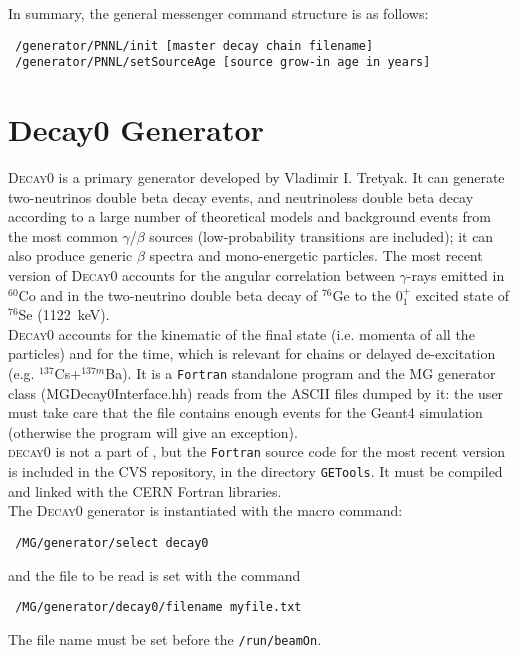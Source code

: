  In summary, the general messenger command structure is as follows:
 

\begin{lstlisting}
 /generator/PNNL/init [master decay chain filename]
 /generator/PNNL/setSourceAge [source grow-in age in years]
\end{lstlisting}

\section{Decay0 Generator}

\textsc{Decay0} is a primary generator developed by Vladimir I. Tretyak. 
It can generate two-neutrinos double beta decay events, and neutrinoless double beta decay 
according to a large number of theoretical models and background events from the most common 
$\gamma$/$\beta$ sources (low-probability transitions are included); it can also produce 
generic $\beta$ spectra and mono-energetic particles. The most recent version of 
\textsc{Decay0} accounts for the angular correlation between $\gamma$-rays emitted in 
$^{60}$Co and in the two-neutrino double beta decay of $^{76}$Ge to the $0^{+}_{1}$ 
excited state of $^{76}$Se (1122~keV).\\ 
\textsc{Decay0} accounts for the kinematic of the final state (i.e. momenta of all 
the particles) and for the time, which is relevant for chains or delayed 
de-excitation (e.g. $^{137}$Cs+$^{137m}$Ba). It is a \texttt{Fortran} standalone 
program and the MG generator class (MGDecay0Interface.hh) reads from the ASCII files 
dumped by it: the user must take care that the file contains enough 
events for the Geant4 simulation (otherwise the program will give an 
exception). \\
\textsc{decay0} is not a part of \mage, but the \texttt{Fortran} source code for 
the most recent version is included in the CVS repository, in the directory \texttt{GETools}. 
It must be compiled and linked with the CERN Fortran libraries. \\
%
The \textsc{Decay0} generator is instantiated with the macro command:
%
\begin{lstlisting}
 /MG/generator/select decay0
\end{lstlisting}
%
and the file to be read is set with the command  
%
\begin{lstlisting}
 /MG/generator/decay0/filename myfile.txt
\end{lstlisting}
%
The file name must be set before the \texttt{/run/beamOn}.
%
